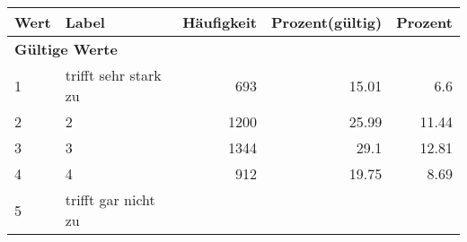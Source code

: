      \begin{longtable}{lXrrr}
     \toprule
     \textbf{Wert} & \textbf{Label} & \textbf{Häufigkeit} & \textbf{Prozent(gültig)} & \textbf{Prozent} \\
     \endhead
     \midrule
     \multicolumn{5}{l}{\textbf{Gültige Werte}}\\

     1 &
     \multicolumn{1}{X}{ trifft sehr stark zu   } &


       \num{693} &
       \num[round-mode=places,round-precision=2]{15,01} &
         \num[round-mode=places,round-precision=2]{6,6} \\

     2 &
     \multicolumn{1}{X}{ 2   } &


       \num{1200} &
       \num[round-mode=places,round-precision=2]{25,99} &
         \num[round-mode=places,round-precision=2]{11,44} \\

     3 &
     \multicolumn{1}{X}{ 3   } &


       \num{1344} &
       \num[round-mode=places,round-precision=2]{29,1} &
         \num[round-mode=places,round-precision=2]{12,81} \\

     4 &
     \multicolumn{1}{X}{ 4   } &


       \num{912} &
       \num[round-mode=places,round-precision=2]{19,75} &
         \num[round-mode=places,round-precision=2]{8,69} \\

     5 &
     \multicolumn{1}{X}{ trifft gar nicht zu   } &



\end{longtable}
